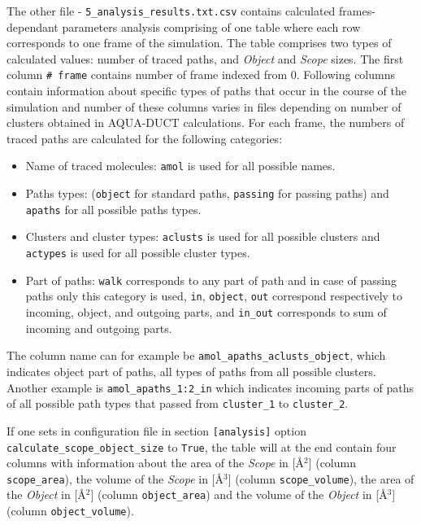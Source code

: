 \documentclass[9pt,tutorial]{livecoms}
\begin{document}
The other file - \texttt{5\_analysis\_results.txt.csv} contains calculated frames-dependant parameters analysis comprising of one table where each row corresponds to one frame of the simulation. The table comprises two types of calculated values: number of traced paths, and \textit{Object} and \textit{Scope} sizes. The first column \texttt{\# frame} contains number of frame indexed from 0. Following columns contain information about specific types of paths that occur in the course of the simulation and number of these columns varies in files depending on number of clusters obtained in AQUA-DUCT calculations. For each frame, the numbers of traced paths are calculated for the following categories:
\begin{itemize}
\item Name of traced molecules: \texttt{amol} is used for all possible names.
\item Paths types: (\texttt{object} for standard paths, \texttt{passing} for passing paths) and \texttt{apaths} for all possible paths types.
\item Clusters and cluster types: \texttt{aclusts} is used for all possible clusters and \texttt{actypes} is used for all possible cluster types.
\item Part of paths: \texttt{walk} corresponds to any part of path and in case of passing paths only this category is used, \texttt{in}, \texttt{object}, \texttt{out} correspond respectively to incoming, object, and outgoing parts, and \texttt{in\_out} corresponds to sum of incoming and outgoing parts.
\end{itemize}
The column name can for example be \newline \texttt{amol\_apaths\_aclusts\_object}, which indicates object part of paths, all types of paths from all possible clusters. Another example is \texttt{amol\_apaths\_1:2\_in} which indicates incoming parts of paths of all possible path types that passed from \texttt{cluster\_1} to \texttt{cluster\_2}.

If one sets in configuration file in section \texttt{[analysis]} option \texttt{calculate\_scope\_object\_size} to \texttt{True}, the table will at the end contain four columns with information about the area of the \textit{Scope} in [Å\( \displaystyle ^{2}\)] (column \texttt{scope\_area}), the volume of the \textit{Scope} in [Å\( \displaystyle ^{3}\)] (column \texttt{scope\_volume}), the area of the \textit{Object} in [Å\( \displaystyle ^{2}\)] (column \texttt{object\_area}) and the volume of the \textit{Object} in [Å\( \displaystyle ^{3}\)]  (column \texttt{object\_volume}).
\end{document}
